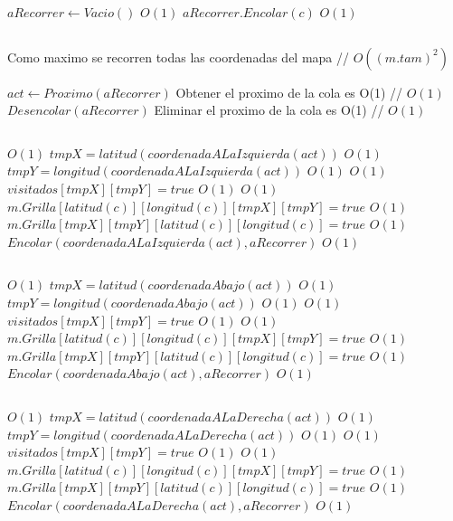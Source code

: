 \begin{Algoritmos}
\begin{algorithmic}[1]
\State $aRecorrer \gets Vacio() $ \Comment $O(1)$
\State $aRecorrer.Encolar(c)$ \Comment $O(1)$

\State $ $

    \Comment Como maximo se recorren todas las coordenadas del mapa // $O((m.tam)^2)$

\State $act \gets Proximo(aRecorrer)$ \Comment Obtener el proximo de la cola es O(1) // $O(1)$
\State $Desencolar(aRecorrer)$ \Comment Eliminar el proximo de la cola es O(1) // $O(1)$

\State $ $


      \Comment $O(1)$
\State $tmpX = latitud(coordenadaALaIzquierda(act))$   \Comment $O(1)$
\State $tmpY = longitud(coordenadaALaIzquierda(act))$  \Comment $O(1)$
    \Comment $O(1)$
\State $visitados[tmpX][tmpY] = true$    \Comment $O(1)$
	 	\Comment $O(1)$
		\State $m.Grilla[latitud(c)][longitud(c)][tmpX][tmpY] = true$ \Comment $O(1)$
		\State $m.Grilla[tmpX][tmpY][latitud(c)][longitud(c)] = true$ \Comment $O(1)$
		\State $Encolar(coordenadaALaIzquierda(act), aRecorrer)$ \Comment $O(1)$	
	\EndIf
\EndIf
\EndIf

\State $ $

      \Comment $O(1)$
\State $tmpX = latitud(coordenadaAbajo(act))$   \Comment $O(1)$
\State $tmpY = longitud(coordenadaAbajo(act))$  \Comment $O(1)$
    \Comment $O(1)$
\State $visitados[tmpX][tmpY] = true$    \Comment $O(1)$
	 	\Comment $O(1)$
		\State $m.Grilla[latitud(c)][longitud(c)][tmpX][tmpY] = true$ \Comment $O(1)$
		\State $m.Grilla[tmpX][tmpY][latitud(c)][longitud(c)] = true$ \Comment $O(1)$
		\State $Encolar(coordenadaAbajo(act), aRecorrer)$ \Comment $O(1)$		
	\EndIf
\EndIf
\EndIf

\State $ $


      \Comment $O(1)$
\State $tmpX = latitud(coordenadaALaDerecha(act))$   \Comment $O(1)$
\State $tmpY = longitud(coordenadaALaDerecha(act))$  \Comment $O(1)$
    \Comment $O(1)$
\State $visitados[tmpX][tmpY] = true$    \Comment $O(1)$
	 	\Comment $O(1)$
		\State $m.Grilla[latitud(c)][longitud(c)][tmpX][tmpY] = true$ \Comment $O(1)$
		\State $m.Grilla[tmpX][tmpY][latitud(c)][longitud(c)] = true$ \Comment $O(1)$
		\State $Encolar(coordenadaALaDerecha(act), aRecorrer)$ \Comment $O(1)$		
	\EndIf
\EndIf
\EndIf


\end{algorithmic}
\end{Algoritmos}
